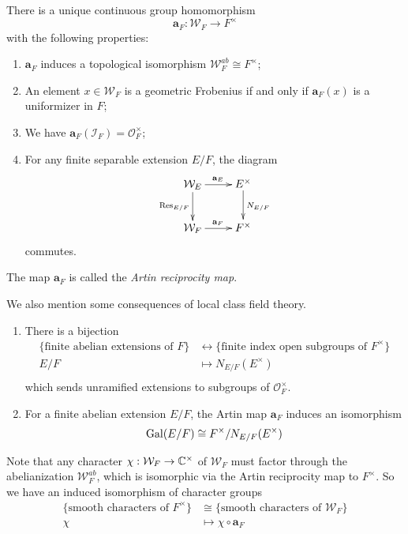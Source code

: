 \begin{thm}
	There is a unique continuous group homomorphism
	\[\mathbf{a}_F: \mathcal{W}_F\to F^\times\]
	with the following properties:
	\begin{enumerate}
		\item $\mathbf{a}_F$ induces a topological isomorphism $\mathcal{W}_F^{ab}\cong F^\times$;
		\item An element $x\in \mathcal{W}_F$ is a geometric Frobenius if and only if $\mathbf{a}_F(x)$ is a uniformizer in $F$;
		\item We have $\mathbf{a}_F(\mathcal{I}_F) = \mathcal{O}_F^\times$;
		\item For any finite separable extension $E/F$, the diagram 
		$$\xymatrix{
			\mathcal W_E \ar[r]^{\mathbf a_E} \ar[d]_{\Res_{E/F}} & E^\times \ar[d]^{N_{E/F}} \\
			\mathcal W_F \ar[r]^{\mathbf a_F} & F^\times
		}$$
		commutes.
	\end{enumerate}
	The map $\mathbf{a}_F$ is called the \emph{Artin reciprocity map}.
\end{thm}
We also mention some consequences of local class field theory.
\begin{cor}
	\begin{enumerate}
	\item There is a bijection
		\begin{align*}
			\{\text{finite abelian extensions of $F$}\} &\leftrightarrow \{\text{finite index open subgroups of $F^\times$}\}\\
				E/F &\mapsto N_{E/F}(E^\times)\\
		\end{align*}
		which sends unramified extensions to subgroups of $\mathcal{O}_F^\times$.
	\item For a finite abelian extension $E/F$, the Artin map $\mathbf{a}_F$ induces an isomorphism
		\[\mathrm{Gal}(E/F)\cong F^\times/N_{E/F}(E^\times)\]
	\end{enumerate}
\end{cor}
Note that any character $\chi: \mathcal{W}_F\to \mathbb{C}^\times$ of $\mathcal{W}_F$ must factor through the abelianization $\mathcal{W}_F^{ab}$, which is isomorphic via the Artin reciprocity map to $F^\times$. So we have an induced isomorphism of character groups
\begin{align*}
	\{\text{smooth characters of }F^\times\} &\cong \{\text{smooth characters of }\mathcal{W}_F\}\\
	\chi &\mapsto \chi\circ\mathbf{a}_F
\end{align*}
